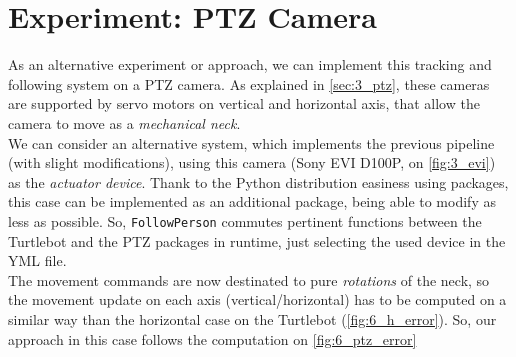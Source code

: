 \section{Experiment: PTZ Camera}
	\label{sec:follow_ptz}
	As an alternative experiment or approach, we can implement this tracking and following system on a PTZ camera. As explained in \autoref{sec:3_ptz}, these cameras are supported by servo motors on vertical and horizontal axis, that allow the camera to move as a \emph{mechanical neck}.\\
	
	We can consider an alternative system, which implements the previous pipeline (with slight modifications), using this camera (Sony EVI D100P, on \autoref{fig:3_evi}) as the \emph{actuator device}. Thank to the Python distribution easiness using packages, this case can be implemented as an additional package, being able to modify as less as possible. So, \texttt{FollowPerson} commutes pertinent functions between the Turtlebot and the PTZ packages in runtime, just selecting the used device in the YML file.\\
	
	The movement commands are now destinated to pure \emph{rotations} of the neck, so the movement update on each axis (vertical/horizontal) has to be computed on a similar way than the horizontal case on the Turtlebot (\autoref{fig:6_h_error}). So, our approach in this case follows the computation on \autoref{fig:6_ptz_error}
	
